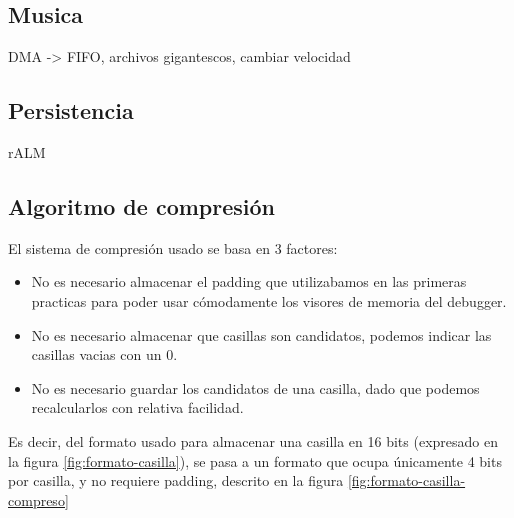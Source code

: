 \documentclass[12pt,letterpaper]{article}
\begin{document}
\subsection{Musica}
\label{subsec:musica}
DMA -> FIFO, archivos gigantescos, cambiar velocidad

\subsection{Persistencia}
\label{subsec:persistencia}
rALM


\subsection{Algoritmo de compresión}
\label{subsec:algoritmo-compresion}

El sistema de compresión usado se basa en 3 factores:
\begin{itemize}
  \item No es necesario almacenar el padding que utilizabamos en las
    primeras practicas para poder usar cómodamente los visores de
    memoria del debugger.
  \item No es necesario almacenar que casillas son candidatos, podemos
    indicar las casillas vacias con un 0.
  \item No es necesario guardar los candidatos de una casilla, dado
    que podemos recalcularlos con relativa facilidad.
\end{itemize}

Es decir, del formato usado para almacenar una casilla en 16 bits
(expresado en la figura \ref{fig:formato-casilla}), se pasa a un
formato que ocupa únicamente 4 bits por casilla, y no requiere
padding, descrito en la figura \ref{fig:formato-casilla-compreso}
\end{document}
